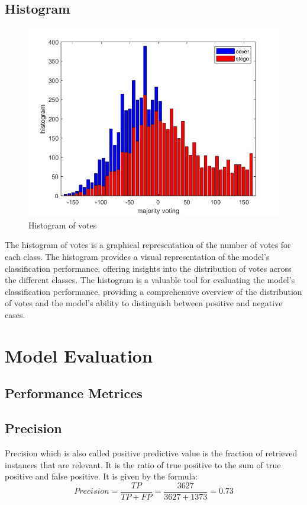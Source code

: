 \subsection{Histogram}
\begin{figure}[H]
    \centering
    \includegraphics[width=120mm]{./img/2600/histo2600.jpg}
    \caption{Histogram of votes}
\end{figure}
The histogram of votes is a graphical representation of the number of votes for each class. The histogram provides a visual representation of the model's classification performance, offering insights into the distribution of votes across the different classes. The histogram is a valuable tool for evaluating the model's classification performance, providing a comprehensive overview of the distribution of votes and the model's ability to distinguish between positive and negative cases.

\section{Model Evaluation}
\subsection{Performance Metrices}
\subsection*{Precision}
Precision which is also called positive predictive value is the fraction of retrieved instances that are relevant. It is the ratio of true positive to the sum of true positive and false positive. It is given by the formula:
$$Precision = \frac{TP}{TP+FP} = \frac{3627}{3627+1373} = 0.73 $$
